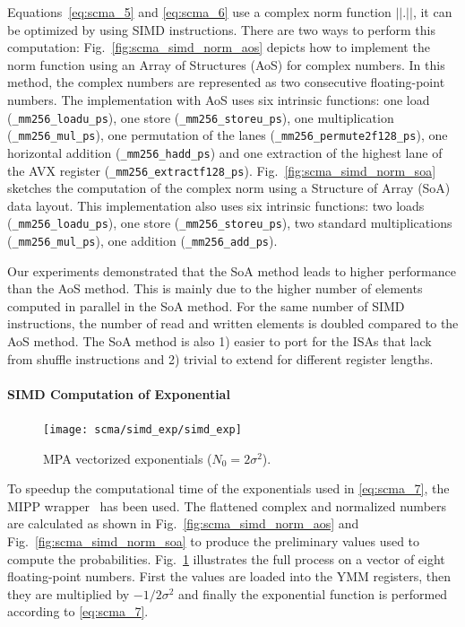 Equations~\eqref{eq:scma_5} and \eqref{eq:scma_6} use a complex norm function
$||.||$, it can be optimized by using SIMD instructions. There are two ways to
perform this computation: Fig.~\ref{fig:scma_simd_norm_aos} depicts how to
implement the norm function using an Array of Structures (AoS) for complex
numbers. In this method, the complex numbers are represented as two consecutive
floating-point numbers. The implementation with AoS uses six intrinsic
functions: one load (\verb|_mm256_loadu_ps|), one store
(\verb|_mm256_storeu_ps|), one multiplication (\verb|_mm256_mul_ps|), one
permutation of the lanes (\verb|_mm256_permute2f128_ps|), one horizontal
addition (\verb|_mm256_hadd_ps|) and one extraction of the highest lane of the
AVX register (\verb|_mm256_extractf128_ps|). Fig.~\ref{fig:scma_simd_norm_soa}
sketches the computation of the complex norm using a Structure of Array (SoA)
data layout. This implementation also uses six intrinsic functions: two loads
(\verb|_mm256_loadu_ps|), one store (\verb|_mm256_storeu_ps|), two standard
multiplications (\verb|_mm256_mul_ps|), one addition (\verb|_mm256_add_ps|).

Our experiments demonstrated that the SoA method leads to higher performance
than the AoS method. This is mainly due to the higher number of elements
computed in parallel in the SoA method. For the same number of SIMD
instructions, the number of read and written elements is doubled compared to the
AoS method. The SoA method is also 1) easier to port for the ISAs that lack from
shuffle instructions and 2) trivial to extend for different register lengths.

\paragraph{SIMD Computation of Exponential}

\begin{figure}[htp]
  \centering
  \texttt{[image: scma/simd\_exp/simd\_exp]}
  \caption {MPA vectorized exponentials ($N_0 = 2\sigma^2$).}
  \label{fig:scma_simd_exp}
\end{figure}

To speedup the computational time of the exponentials used in \eqref{eq:scma_7},
the MIPP wrapper~\cite{Cassagne2018} has been used. The flattened complex and
normalized numbers are calculated as shown in Fig.~\ref{fig:scma_simd_norm_aos}
and Fig.~\ref{fig:scma_simd_norm_soa} to produce the preliminary values used to
compute the probabilities. Fig.~\ref{fig:scma_simd_exp} illustrates the full
process on a vector of eight floating-point numbers. First the values are loaded
into the YMM registers, then they are multiplied by $-1/2\sigma^2$ and finally
the exponential function is performed according to \eqref{eq:scma_7}.

